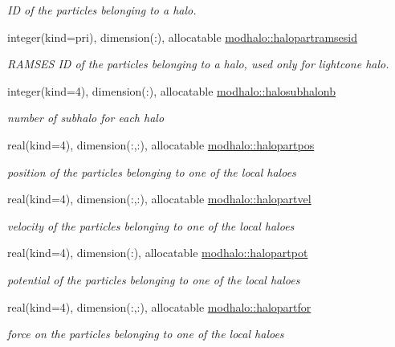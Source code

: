 \begin{DoxyCompactItemize}
\begin{DoxyCompactList}\small\item\em ID of the particles belonging to a halo. \end{DoxyCompactList}\item 
integer(kind=pri), dimension(\+:), allocatable \hyperlink{namespacemodhalo_a5b68c60e3d37130087e8314a89f8f880}{modhalo\+::halopartramsesid}
\begin{DoxyCompactList}\small\item\em R\+A\+M\+S\+ES ID of the particles belonging to a halo, used only for lightcone halo. \end{DoxyCompactList}\item 
integer(kind=4), dimension(\+:), allocatable \hyperlink{namespacemodhalo_a5047e50f3939eaf91496eb430ea12952}{modhalo\+::halosubhalonb}
\begin{DoxyCompactList}\small\item\em number of subhalo for each halo \end{DoxyCompactList}\item 
real(kind=4), dimension(\+:,\+:), allocatable \hyperlink{namespacemodhalo_a935d49a97e72fe931ab0e2cee84d1523}{modhalo\+::halopartpos}
\begin{DoxyCompactList}\small\item\em position of the particles belonging to one of the local haloes \end{DoxyCompactList}\item 
real(kind=4), dimension(\+:,\+:), allocatable \hyperlink{namespacemodhalo_a9d88ee4555aab3eb3cc4626800de250b}{modhalo\+::halopartvel}
\begin{DoxyCompactList}\small\item\em velocity of the particles belonging to one of the local haloes \end{DoxyCompactList}\item 
real(kind=4), dimension(\+:), allocatable \hyperlink{namespacemodhalo_ae632dc8638ef825d9db5997b21fd3b63}{modhalo\+::halopartpot}
\begin{DoxyCompactList}\small\item\em potential of the particles belonging to one of the local haloes \end{DoxyCompactList}\item 
real(kind=4), dimension(\+:,\+:), allocatable \hyperlink{namespacemodhalo_aa850def902800d1eb780c6e4bd47edb9}{modhalo\+::halopartfor}
\begin{DoxyCompactList}\small\item\em force on the particles belonging to one of the local haloes \end{DoxyCompactList}\item 

\end{DoxyCompactItemize}
